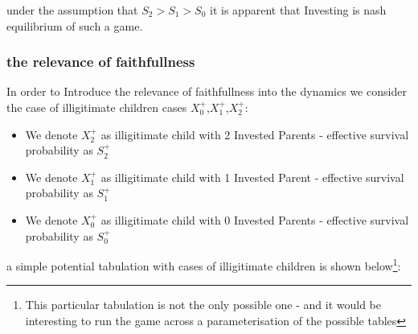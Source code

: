 \documentclass[journal,article,accept,oneauthors,pdftex,10pt,a4paper]{mdpi}
\begin{document}
under the assumption that $S_2>S_1>S_0$ it is apparent that Investing is nash equilibrium of such a game.

\subsubsection{the relevance of faithfullness}

In order to Introduce the relevance of faithfullness into the dynamics we consider the case of illigitimate children cases $X^+_0$,$X^+_1$,$X^+_2$:
\begin{itemize}
  \item We denote $X^+_2$ as illigitimate child with 2 Invested Parents - effective survival probability as $S^+_2$
  \item We denote $X^+_1$ as illigitimate child with 1 Invested Parent - effective survival probability as $S^+_1$
  \item We denote $X^+_0$ as illigitimate child with 0 Invested Parents - effective survival probability as $S^+_0$
\end{itemize}
a simple potential tabulation with cases of illigitimate children is shown below\footnote{This particular tabulation is not the only possible one - and it would be interesting to run the game across a parameterisation of the possible tables}:
\end{document}
